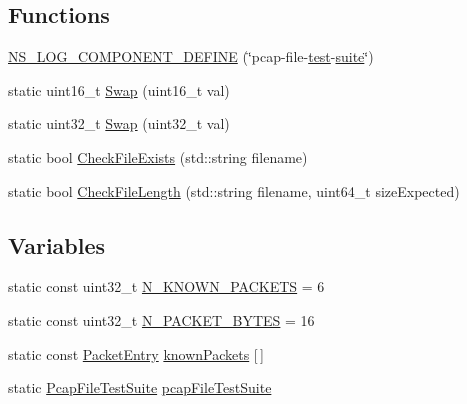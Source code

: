 \subsection*{Functions}
\begin{DoxyCompactItemize}
\item 
\hyperlink{pcap-file-test-suite_8cc_a7ac4882bd1b6acb06cfc1714d46c35e8}{N\+S\+\_\+\+L\+O\+G\+\_\+\+C\+O\+M\+P\+O\+N\+E\+N\+T\+\_\+\+D\+E\+F\+I\+NE} (\char`\"{}pcap-\/file-\/\hyperlink{main-test-sync_8cc_a708a4c1a4d0c4acc4c447310dd4db27f}{test}-\/\hyperlink{type-id-test-suite_8cc_ab4acb0fe33ca0947f675eed6196ed8ca}{suite}\char`\"{})
\item 
static uint16\+\_\+t \hyperlink{pcap-file-test-suite_8cc_a9baeceaeb66adfc7bddae33a81ad8fa7}{Swap} (uint16\+\_\+t val)
\item 
static uint32\+\_\+t \hyperlink{pcap-file-test-suite_8cc_ac114fc95f2ad41656147d54972a1337d}{Swap} (uint32\+\_\+t val)
\item 
static bool \hyperlink{pcap-file-test-suite_8cc_a4e90999451af2d85d014e610a7ab9d0b}{Check\+File\+Exists} (std\+::string filename)
\item 
static bool \hyperlink{pcap-file-test-suite_8cc_a6206c639b9ce76fb5ca2c548ce4a5935}{Check\+File\+Length} (std\+::string filename, uint64\+\_\+t size\+Expected)
\end{DoxyCompactItemize}
\subsection*{Variables}
\begin{DoxyCompactItemize}
\item 
static const uint32\+\_\+t \hyperlink{pcap-file-test-suite_8cc_a368109b7271b955012621f214217cc55}{N\+\_\+\+K\+N\+O\+W\+N\+\_\+\+P\+A\+C\+K\+E\+TS} = 6
\item 
static const uint32\+\_\+t \hyperlink{pcap-file-test-suite_8cc_afbd70e37403299f8c72166deb34c04c3}{N\+\_\+\+P\+A\+C\+K\+E\+T\+\_\+\+B\+Y\+T\+ES} = 16
\item 
static const \hyperlink{pcap-file-test-suite_8cc_a07a6d9abbb9c6f00cecc5347d1a5ae9e}{Packet\+Entry} \hyperlink{pcap-file-test-suite_8cc_acfb9111e8cf0f99feb122526fba2c98d}{known\+Packets} \mbox{[}$\,$\mbox{]}
\item 
static \hyperlink{classPcapFileTestSuite}{Pcap\+File\+Test\+Suite} \hyperlink{pcap-file-test-suite_8cc_af01832c2f7134abdfa1757c4e7ac74fc}{pcap\+File\+Test\+Suite}
\end{DoxyCompactItemize}


